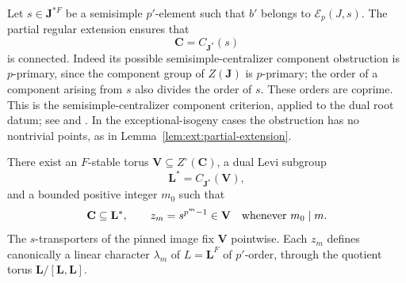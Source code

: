 Let $s\in\mathbf J^{*F}$ be a semisimple $p'$-element such that $b'$
belongs to $\mathcal E_p(J,s)$.  The partial regular extension ensures
that
\[
 \mathbf C=C_{\mathbf J^*}(s)
\]
is connected.  Indeed its possible semisimple-centralizer component
obstruction is $p$-primary, since the component group of
$Z(\mathbf J)$ is $p$-primary; the order of a component arising from
$s$ also divides the order of $s$.  These orders are coprime.  This is
the semisimple-centralizer component criterion, applied to the dual
root datum; see \cite[Corollary~2.9]{BonnafeQuasiIsolated} and
\cite[Proposition~14.20]{MalleTesterman}.  In the exceptional-isogeny cases the obstruction has no
nontrivial points, as in Lemma~\ref{lem:ext:partial-extension}.

\begin{lemma}\label{per:fixed-torus}
There exist an $F$-stable torus $\mathbf V\subseteq Z^\circ(\mathbf C)$,
a dual Levi subgroup
\[
 \mathbf L^*=C_{\mathbf J^*}(\mathbf V),
\]
and a bounded positive integer $m_0$ such that
\[
 \mathbf C\subseteq\mathbf L^*,\qquad
 z_m=s^{p^m-1}\in\mathbf V
       \quad\hbox{whenever }m_0\mid m.
\]
The $s$-transporters of the pinned image fix $\mathbf V$ pointwise.
Each $z_m$ defines canonically a linear character $\lambda_m$ of
$L=\mathbf L^F$ of $p'$-order, through the quotient torus
$\mathbf L/[\mathbf L,\mathbf L]$.
\end{lemma}

